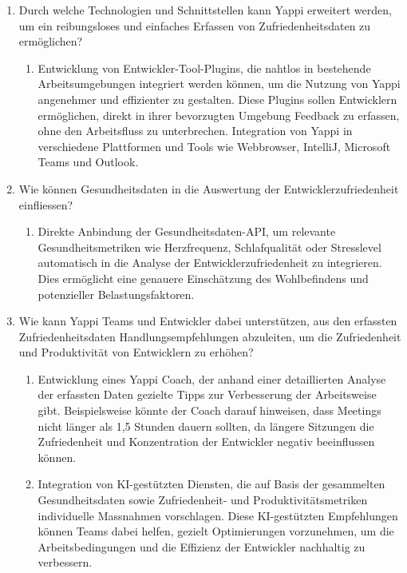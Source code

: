 \documentclass[12pt,a4paper]{report}
\begin{document}
\begin{enumerate}[label=\Alph*.]
  \item Durch welche Technologien und Schnittstellen kann Yappi erweitert werden,
        um ein reibungsloses und einfaches Erfassen von Zufriedenheitsdaten zu ermöglichen?
        \begin{enumerate}[label=\alph*.]
          \item Entwicklung von Entwickler-Tool-Plugins, die nahtlos in bestehende Arbeitsumgebungen
                integriert werden können, um die Nutzung von Yappi angenehmer und effizienter zu gestalten.
                Diese Plugins sollen Entwicklern ermöglichen, direkt in ihrer bevorzugten Umgebung Feedback
                zu erfassen, ohne den Arbeitsfluss zu unterbrechen. Integration von Yappi in verschiedene
                Plattformen und Tools wie Webbrowser, IntelliJ, Microsoft Teams und Outlook.
        \end{enumerate}
  \item Wie können Gesundheitsdaten in die Auswertung der Entwicklerzufriedenheit einfliessen?
        \begin{enumerate}[label=\alph*.]
          \item Direkte Anbindung der Gesundheitsdaten-API, um relevante Gesundheitsmetriken wie
                Herzfrequenz, Schlafqualität oder Stresslevel automatisch in die Analyse der
                Entwicklerzufriedenheit zu integrieren. Dies ermöglicht eine genauere Einschätzung des
                Wohlbefindens und potenzieller Belastungsfaktoren.
        \end{enumerate}
  \item Wie kann Yappi Teams und Entwickler dabei unterstützen, aus den erfassten
        Zufriedenheitsdaten Handlungsempfehlungen abzuleiten, um die Zufriedenheit und Produktivität
        von Entwicklern zu erhöhen?
        \begin{enumerate}[label=\alph*.]
          \item Entwicklung eines Yappi Coach, der anhand einer detaillierten Analyse der erfassten
                Daten gezielte Tipps zur Verbesserung der Arbeitsweise gibt. Beispielsweise könnte der Coach
                darauf hinweisen, dass Meetings nicht länger als 1,5 Stunden dauern sollten, da längere
                Sitzungen die Zufriedenheit und Konzentration der Entwickler negativ beeinflussen können.
          \item Integration von KI-gestützten Diensten, die auf Basis der gesammelten Gesundheitsdaten
                sowie Zufriedenheit- und Produktivitätsmetriken individuelle Massnahmen vorschlagen. Diese
                KI-gestützten Empfehlungen können Teams dabei helfen, gezielt Optimierungen vorzunehmen, um
                die Arbeitsbedingungen und die Effizienz der Entwickler nachhaltig zu verbessern.
        \end{enumerate}
\end{enumerate}
\end{document}
